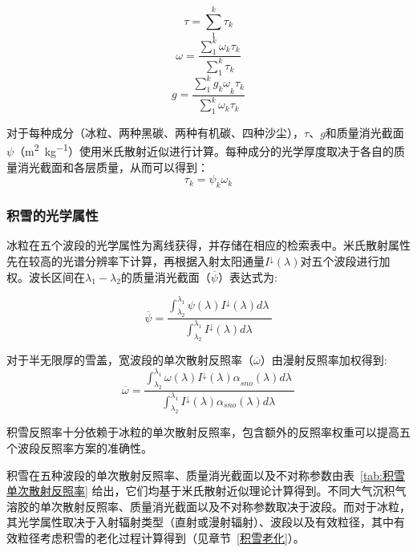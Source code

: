 \begin{equation}
\tau = \sum_{1}^{k}\tau_{k}
\end{equation}
%
\begin{equation}
\omega = \frac{\sum_{1}^{k}\omega_{k}\tau_{k}}{\sum_{1}^{k}\tau_{k}}
\end{equation}
%
\begin{equation}
g = \frac{\sum_{1}^{k}{g_{k}\omega}_{k}\tau_{k}}{\sum_{1}^{k}\omega_{k}\tau_{k}}
\end{equation}

对于每种成分（冰粒、两种黑碳、两种有机碳、四种沙尘），$\tau$、$g$和质量消光截面$\psi$（\unit{m^2.kg^{-1}}）使用米氏散射近似进行计算。每种成分的光学厚度取决于各自的质量消光截面和各层质量，从而可以得到：
\begin{equation}
\tau_{k} = \psi_{k}\omega_{k}
\end{equation}

\subsubsection{积雪的光学属性}
冰粒在五个波段的光学属性为离线获得，并存储在相应的检索表中。米氏散射属性先在较高的光谱分辨率下计算，再根据入射太阳通量\(I^{\downarrow}(\lambda)\)对五个波段进行加权。波长区间在$\lambda_{1}-\lambda_{2}$的质量消光截面（\(\overline{\psi}\)）表达式为:

\begin{equation}
\overline{\psi} = \frac{\int_{\lambda_{2}}^{\lambda_{1}}{\psi(\lambda)I^{\downarrow}(\lambda)d\lambda\ }}{\int_{\lambda_{2}}^{\lambda_{1}}{I^{\downarrow}(\lambda)d\lambda\ }}
\end{equation}

对于半无限厚的雪盖，宽波段的单次散射反照率（\(\overline{\omega}\)）由漫射反照率加权得到:
\begin{equation}
\overline{\omega} = \frac{\int_{\lambda_{2}}^{\lambda_{1}}{\omega(\lambda){I^{\downarrow}(\lambda)\alpha}_{sno}(\lambda)d\lambda\ }}{\int_{\lambda_{2}}^{\lambda_{1}}{I^{\downarrow}(\lambda)\alpha_{sno}(\lambda)d\lambda\ }}
\end{equation}

积雪反照率十分依赖于冰粒的单次散射反照率，包含额外的反照率权重可以提高五个波段反照率方案的准确性\citep{flanner2007PresentdayClimateForcing}。

积雪在五种波段的单次散射反照率、质量消光截面以及不对称参数由表~\ref{tab:积雪单次散射反照率} 给出，它们均基于米氏散射近似理论计算得到。不同大气沉积气溶胶的单次散射反照率、质量消光截面以及不对称参数取决于波段。而对于冰粒，其光学属性取决于入射辐射类型（直射或漫射辐射）、波段以及有效粒径，其中有效粒径考虑积雪的老化过程计算得到（见章节~\ref{积雪老化}）。

